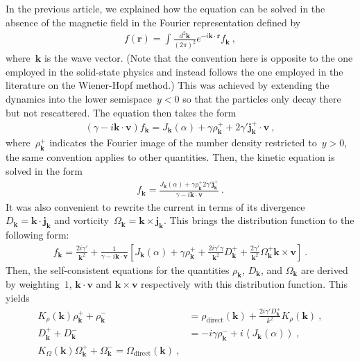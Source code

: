 \documentclass[preprint,aps,eqsecnum]{revtex4-1}
\newcommand{\fplus}[1]{{#1}^{+}}
\newcommand{\fminus}[1]{{#1}^{-}}
\begin{document}
In the previous article, we explained how the equation
can be solved in the absence of the magnetic field in the Fourier
representation defined by
\begin{align}
  f({\bm r}) = \int \frac{d^2 {\bm k}}{(2\pi)^2} e^{-i{\bm k}\cdot{\bm r}}
  f_{\bm k}\ ,
\end{align}
where~${\bm k}$ is the wave vector.
(Note that the convention here is opposite to the one employed in the
solid-state physics and instead follows the one employed in the literature
on the Wiener-Hopf method.)
This was achieved by extending the dynamics into the
lower semispace~$y < 0$ so that the particles only decay there but
not rescattered. The equation then takes the form
\begin{align}
  (\gamma - i {\bm k} \cdot {\bm v}) f_{\bm k} =
  J_{\bm k}(\alpha) + \gamma \fplus{\rho}_{\bm k}
  + 2\gamma' \fplus{\bm j}_{\bm k}
  \cdot {\bm v}\ , 
\end{align}
where~$\fplus{\rho}_{\bm k}$ indicates the Fourier image of
the number density restricted to~$y > 0$, the same convention
applies to other quantities. 
Then, the kinetic equation is solved in the form
\begin{align}
  f_{\bm k} = \frac{J_{\bm k}(\alpha) + \gamma \fplus{\rho}_{\bm k}
   2\gamma' \fplus{{\bm j}}_{\bm k}}{\gamma - i {\bm k} \cdot {\bm v}}\ . 
\end{align}
It was also convenient to rewrite the current in terms of
its divergence~$D_{\bm k} = {\bm k} \cdot {\bm j}_{\bm k}$
and vorticity~$\Omega_{\bm k} = {\bm k} \times {\bm j}_{\bm k}$.
This brings the distribution function to the following form:
\begin{align}
  f_{\bm k} = \frac{2i\gamma'}{\bm k^2} +
  \frac{1}{\gamma - i {\bm k} \cdot {\bm v}}
  \left[J_{\bm k}(\alpha) + \gamma \fplus{\rho}_{\bm k}
  + \frac{2i\gamma' \gamma}{{\bm k}^2} \fplus{D}_{\bm k} 
  + \frac{2\gamma'}{\bm k^2} \fplus{\Omega}_{\bm k} {\bm k} \times {\bm v}
  \right]\ . 
\end{align}
Then, the self-consistent equations for the quantities
$\rho_{\bm k}$, $D_{\bm k}$, and $\Omega_{\bm k}$  are
derived by  weighting~$1$, ${\bm k} \cdot{\bm v}$ and ${\bm k}\times{\bm v}$
respectively with this distribution function. This yields
\begin{align}
K_\rho({\bm k}) \fplus{\rho}_{\bm k}
+ \fminus{\rho}_{\bm k} &= \rho_\mathrm{direct}({\bm k})
+ \frac{2 i \gamma' \fplus{D}_{\bm k}}{k^2} K_\rho({\bm k}) \ , \\
\fplus{D}_{\bm k} + \fminus{D}_{\bm k}
&= -i \gamma \fminus{\rho}_{\bm k} + i \left\langle J_{\bm k}(\alpha)
  \right\rangle \ , \\
K_\Omega({\bm k}) \fplus{\Omega}_{\bm k}  + \fminus{\Omega}_{\bm k}
= \Omega_\mathrm{direct}({\bm k})\ , 
\end{align}
\end{document}
